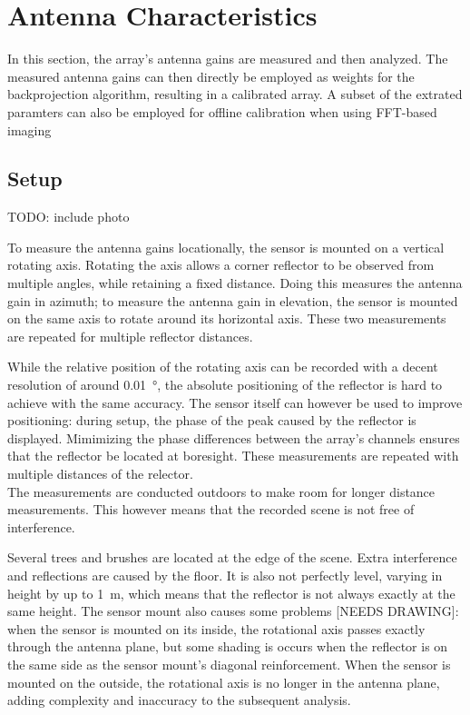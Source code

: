 \newblock
\section{Antenna Characteristics}
\label{sec:calibration}

In this section, the array's antenna gains are measured and then analyzed.
The measured antenna gains can then directly be employed as weights for the backprojection algorithm,
resulting in a calibrated array.
A subset of the extrated paramters can also be employed for offline calibration when using FFT-based imaging

\subsection{Setup}
TODO: include photo

To measure the antenna gains locationally, the sensor is mounted on a vertical rotating axis.
Rotating the axis allows a corner reflector to be observed from multiple angles, while retaining a fixed distance.
Doing this measures the antenna gain in azimuth;
to measure the antenna gain in elevation, the sensor is mounted on the same axis to rotate around its horizontal axis.
These two measurements are repeated for multiple reflector distances.

While the relative position of the rotating axis can be recorded with a decent resolution of around \SI{0.01}{\degree},
the absolute positioning of the reflector is hard to achieve with the same accuracy.
The sensor itself can however be used to improve positioning:
during setup, the phase of the peak caused by the reflector is displayed.
Mimimizing the phase differences between the array's channels ensures that the reflector be located at boresight.
These measurements are repeated with multiple distances of the relector.\\

The measurements are conducted outdoors to make room for longer distance measurements.
This however means that the recorded scene is not free of interference.

Several trees and brushes are located at the edge of the scene.
Extra interference and reflections are caused by the floor.
It is also not perfectly level, varying in height by up to \SI{1}{\meter},
which means that the reflector is not always exactly at the same height.
The sensor mount also causes some problems [NEEDS DRAWING]:
when the sensor is mounted on its inside,
the rotational axis passes exactly through the antenna plane,
but some shading is occurs when the reflector is on the same side as the sensor mount's diagonal reinforcement.
When the sensor is mounted on the outside,
the rotational axis is no longer in the antenna plane,
adding complexity and inaccuracy to the subsequent analysis.

